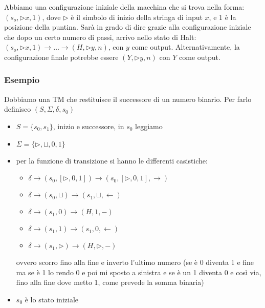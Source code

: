 Abbiamo una configurazione iniziale della macchina che si trova nella forma: $(s_o, \triangleright x, 1)$, dove $\triangleright$ è il simbolo di inizio della stringa di input $x$, e $1$ è la posizione della puntina. Sarà in grado di dire grazie alla configurazione iniziale che dopo un certo numero di passi, arrivo nello stato di Halt: $(s_o, \triangleright x, 1) \to \dots \to (H, \triangleright y, n)$, con $y$ come output. Alternativamente, la configurazione finale potrebbe essere $(Y, \triangleright y, n)$ con $Y$ come output.

\subsubsection{Esempio}
Dobbiamo una TM che restituisce il successore di un numero binario. Per farlo definisco $(S, \Sigma, \delta,s_0)$
 \begin{itemize}
    \item $S=\{s_0,s_1\}$, inizio e successore, in $s_0$ leggiamo
    \item $\Sigma =\{\triangleright, \sqcup, 0,1\}$
    \item per la funzione di transizione si hanno le differenti casistiche:
    \begin{itemize}
        \item $\delta\to(s_0,[\triangleright, 0,1])\to(s_0,[\triangleright, 0,1], \rightarrow)$
        \item $\delta\to(s_0,\sqcup)\to(s_1,\sqcup,\leftarrow)$
        \item $\delta\to(s_1,0)\to(H,1,-)$
        \item $\delta\to(s_1,1)\to(s_1,0,\leftarrow)$
        \item $\delta\to(s_1,\triangleright)\to(H,\triangleright,-)$
    \end{itemize}
    ovvero scorro fino alla fine e inverto l'ultimo numero (se è 0 diventa 1 e fine ma se è 1 lo rendo 0 e poi mi sposto a sinistra e se è un 1 diventa 0 e così via, fino alla fine dove metto 1, come prevede la somma binaria)
    \item $s_0$ è lo stato iniziale
\end{itemize}